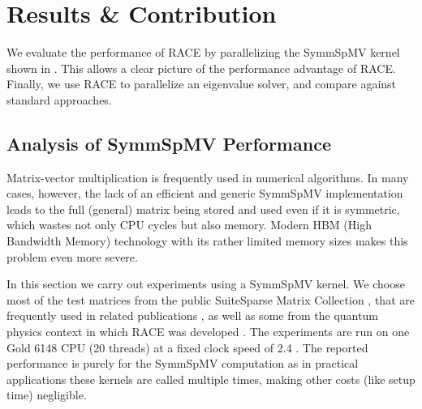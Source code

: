  
\section{Results \& Contribution} \label{sec:results}
We evaluate the performance of \acrshort{RACE} by parallelizing the \acrshort{SymmSpMV}
kernel shown in . This allows a clear picture of the
performance advantage of \acrshort{RACE}. Finally,
 we use \acrshort{RACE} to parallelize an eigenvalue solver, 
and compare against standard approaches.

\subsection{Analysis of SymmSpMV Performance} \label{subsec:perf_symm_spmv}
Matrix-vector multiplication is frequently used in
numerical algorithms. In many cases, however, 
the lack of an efficient and generic \acrshort{SymmSpMV} implementation
leads to the full (general) matrix being stored and used even if it is
symmetric, which wastes not only CPU cycles but also memory.
Modern HBM (High Bandwidth Memory) technology with its rather limited
memory sizes makes this problem even more severe. 

In this section we carry out experiments using a \acrshort{SymmSpMV} kernel.
We choose most of the test matrices from the public SuiteSparse Matrix Collection \cite{UOF}, 
that are frequently used in related publications \cite{RSB,park_ls}, as well as
some from the quantum physics context 
in which \acrshort{RACE} was developed \cite{ESSEX}.
The experiments are
run on one \Intel \SKX Gold 6148 CPU ($20$ threads) at a fixed clock speed of
2.4 \GHZ. The reported performance is purely for the \acrshort{SymmSpMV}
computation as in practical applications these kernels are called multiple times, 
making other costs (like setup time) negligible.

